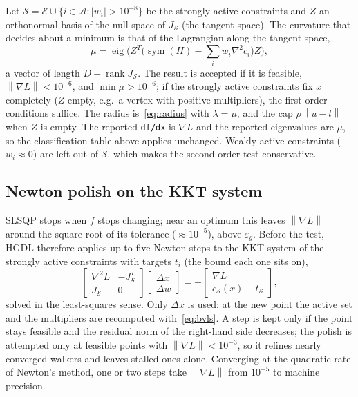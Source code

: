 \documentclass[11pt]{article}
\newcommand{\norm}[1]{\left\lVert #1 \right\rVert}
\newcommand{\code}[1]{\texttt{#1}}
\DeclareMathOperator{\sym}{sym}
\begin{document}
Let $\mathcal{S} = \mathcal{E} \cup \{i \in \mathcal{A} : |w_i| > 10^{-8}\}$ be the strongly
active constraints and $Z$ an orthonormal basis of the null space of $J_{\mathcal{S}}$ (the
tangent space). The curvature that decides about a minimum is that of the Lagrangian along the
tangent space,
\begin{equation}\label{eq:reduced}
  \mu = \operatorname{eig}\!\Big( Z^T \big(\sym(H) - \textstyle\sum_i w_i \nabla^2 c_i\big) Z \Big),
\end{equation}
a vector of length $D - \operatorname{rank} J_{\mathcal{S}}$. The result is accepted if it is
feasible, $\norm{\nabla L} < 10^{-6}$, and $\min \mu > 10^{-6}$; if the strongly active
constraints fix $x$ completely ($Z$ empty, e.g.\ a vertex with positive multipliers), the
first-order conditions suffice. The radius is~\eqref{eq:radius} with $\lambda = \mu$, and the
cap $\rho\norm{u-l}$ when $Z$ is empty. The reported \code{df/dx} is $\nabla L$ and the reported
eigenvalues are $\mu$, so the classification table above applies unchanged. Weakly active
constraints ($w_i \approx 0$) are left out of $\mathcal{S}$, which makes the second-order test
conservative.

\subsection{Newton polish on the KKT system}\label{sec:polish}

SLSQP stops when $f$ stops changing; near an optimum this leaves $\norm{\nabla L}$ around the
square root of its tolerance ($\approx 10^{-5}$), above $\varepsilon_g$. Before the test,
HGDL therefore applies up to five Newton steps to the KKT system of the strongly active
constraints with targets $t_i$ (the bound each one sits on),
\begin{equation}\label{eq:kktnewton}
  \begin{bmatrix} \nabla^2 L & -J_{\mathcal{S}}^T \\ J_{\mathcal{S}} & 0 \end{bmatrix}
  \begin{bmatrix} \Delta x \\ \Delta w \end{bmatrix}
  = -\begin{bmatrix} \nabla L \\ c_{\mathcal{S}}(x) - t_{\mathcal{S}} \end{bmatrix},
\end{equation}
solved in the least-squares sense. Only $\Delta x$ is used: at the new point the active set and
the multipliers are recomputed with~\eqref{eq:bvls}. A step is kept only if the point stays
feasible and the residual norm of the right-hand side decreases; the polish is attempted only
at feasible points with $\norm{\nabla L} < 10^{-3}$, so it refines nearly converged walkers and
leaves stalled ones alone. Converging at the quadratic rate of Newton's method, one or two
steps take $\norm{\nabla L}$ from $10^{-5}$ to machine precision.
\end{document}
